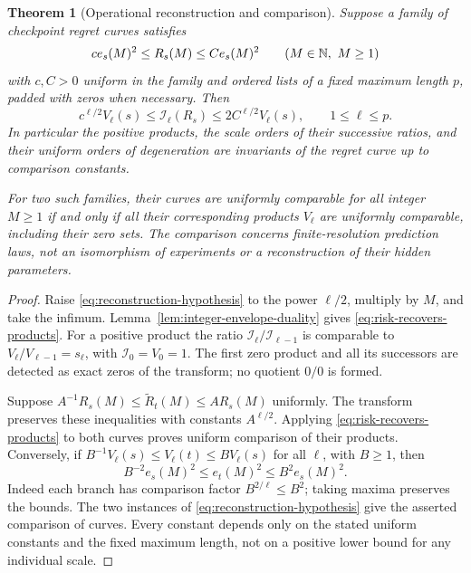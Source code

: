 \documentclass[11pt]{amsart}
\newtheorem{theorem}{Theorem}[section]
\theoremstyle{definition}\newtheorem{definition}[theorem]{Definition}
\theoremstyle{remark}\newtheorem{remark}[theorem]{Remark}
\begin{document}
\begin{theorem}[Operational reconstruction and comparison]
\label{thm:operational-reconstruction}
Suppose a family of checkpoint regret curves satisfies
\begin{equation}\label{eq:reconstruction-hypothesis}
 c e_s(M)^2\le R_s(M)\le C e_s(M)^2
 \qquad(M\in\mathbb N,\ M\ge1)
\end{equation}
with $c,C>0$ uniform in the family and ordered lists of a fixed
maximum length $p$, padded with zeros when necessary. Then
\begin{equation}\label{eq:risk-recovers-products}
 c^{\ell/2}V_\ell(s)\le\mathcal I_\ell(R_s)
             \le2C^{\ell/2}V_\ell(s),\qquad 1\le\ell\le p.
\end{equation}
In particular the positive products, the scale orders of their successive
ratios, and their uniform orders of degeneration are
invariants of the regret curve up to comparison constants.

For two such families, their curves are uniformly comparable for all
integer $M\ge1$ if and only if all their corresponding products
$V_\ell$ are uniformly comparable, including their zero sets.
The comparison concerns finite-resolution prediction laws, not an
isomorphism of experiments or a reconstruction of their hidden parameters.
\end{theorem}
\begin{proof}
Raise \eqref{eq:reconstruction-hypothesis} to the power $\ell/2$,
multiply by $M$, and take the infimum. Lemma~\ref{lem:integer-envelope-duality}
gives \eqref{eq:risk-recovers-products}. For a positive product the
ratio $\mathcal I_\ell/\mathcal I_{\ell-1}$ is comparable to
$V_\ell/V_{\ell-1}=s_\ell$, with $\mathcal I_0=V_0=1$.
The first zero product and all its successors are detected as exact
zeros of the transform; no quotient $0/0$ is formed.

Suppose $A^{-1}R_s(M)\le\widetilde R_t(M)\le A R_s(M)$ uniformly.
The transform preserves these inequalities with constants $A^{\ell/2}$.
Applying \eqref{eq:risk-recovers-products} to both curves proves uniform
comparison of their products. Conversely, if
$B^{-1}V_\ell(s)\le V_\ell(t)\le B V_\ell(s)$ for all $\ell$,
with $B\ge1$, then
\[
 B^{-2}e_s(M)^2\le e_t(M)^2\le B^2e_s(M)^2.
\]
Indeed each branch has comparison factor $B^{2/\ell}\le B^2$;
taking maxima preserves the bounds. The two instances of
\eqref{eq:reconstruction-hypothesis} give the asserted comparison of
curves. Every constant depends only on the stated uniform constants
and the fixed maximum length, not on a positive lower bound for any
individual scale.
\end{proof}
\end{document}
